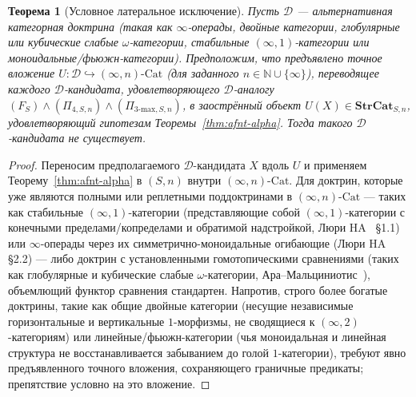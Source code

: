 \documentclass[11pt]{article}
\theoremstyle{plain}
\newtheorem{theorem}{Теорема}[section]
\theoremstyle{definition}
\newcommand{\Cat}{\mathrm{Cat}}
\begin{document}
\begin{theorem}[Условное латеральное исключение]\label{thm:lateral}
Пусть $\mathcal{D}$ — альтернативная категорная доктрина (такая как $\infty$-операды, двойные категории, глобулярные или кубические слабые $\omega$-категории, стабильные $(\infty, 1)$-категории или моноидальные/фьюжн-категории). Предположим, что предъявлено точное вложение $U : \mathcal{D} \hookrightarrow (\infty, n)\text{-}\Cat$ (для заданного $n \in \mathbb{N} \cup \{\infty\}$), переводящее каждого $\mathcal{D}$-кандидата, удовлетворяющего $\mathcal{D}$-аналогу $(F_S) \wedge (\Pi_{4, S, n}) \wedge (\Pi_{3\text{-max}, S, n})$, в заострённый объект $U(X) \in \mathbf{StrCat}_{S, n}$, удовлетворяющий гипотезам Теоремы~\ref{thm:afnt-alpha}. Тогда такого $\mathcal{D}$-кандидата не существует.
\end{theorem}

\begin{proof}
Переносим предполагаемого $\mathcal{D}$-кандидата $X$ вдоль $U$ и применяем Теорему~\ref{thm:afnt-alpha} в $(S, n)$ внутри $(\infty, n)\text{-}\Cat$. Для доктрин, которые уже являются полными или реплетными поддоктринами в $(\infty, n)\text{-}\Cat$ --- таких как стабильные $(\infty, 1)$-категории (представляющие собой $(\infty, 1)$-категории с конечными пределами/копределами и обратимой надстройкой, Люри HA~\cite{LurieHA} \S 1.1) или $\infty$-операды через их симметрично-моноидальные огибающие (Люри HA~\cite{LurieHA} \S 2.2) --- либо доктрин с установленными гомотопическими сравнениями (таких как глобулярные и кубические слабые $\omega$-категории, Ара--Мальциниотис~\cite{AraMaltsiniotis2017}), объемлющий функтор сравнения стандартен. Напротив, строго более богатые доктрины, такие как общие двойные категории (несущие независимые горизонтальные и вертикальные $1$-морфизмы, не сводящиеся к $(\infty, 2)$-категориям) или линейные/фьюжн-категории (чья моноидальная и линейная структура не восстанавливается забыванием до голой $1$-категории), требуют явно предъявленного точного вложения, сохраняющего граничные предикаты; препятствие условно на это вложение.
\end{proof}
\end{document}
